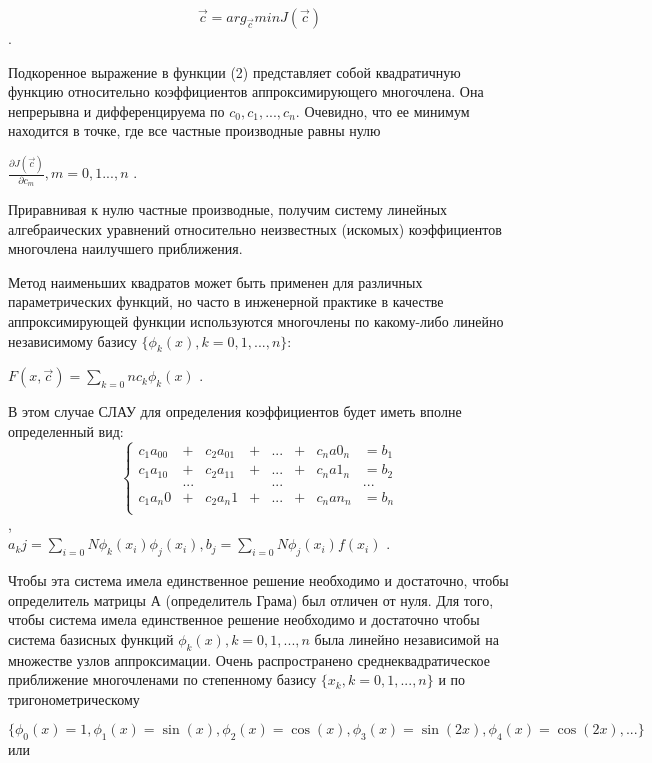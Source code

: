 $$\vec{c}=arg_{\vec{c}} min J(\vec{c})$$.

Подкоренное выражение в функции (2) представляет собой квадратичную функцию относительно коэффициентов аппроксимирующего многочлена. Она непрерывна и дифференцируема по  $c_0,c_1,...,c_n$. Очевидно, что ее минимум находится в точке, где все частные производные равны нулю

 $\frac{\partial{J(\vec{c})}}{\partial{c_m}}, m=0,1...,n$ . 

Приравнивая к нулю частные производные, получим систему линейных алгебраических уравнений относительно неизвестных (искомых) коэффициентов многочлена наилучшего приближения.

Метод наименьших квадратов может быть применен для различных параметрических функций, но часто в инженерной практике в качестве аппроксимирующей функции используются многочлены по какому-либо линейно независимому базису $\{\phi_k(x) , k=0,1,...,n\}$: 

$F(x,\vec{c})=\sum_{k=0}n c_k \phi_k(x)$ . 

В этом случае СЛАУ для определения коэффициентов будет иметь вполне определенный вид:
$$\left\{{\begin{array}{cccccccc}
c_1 a_00&+&c_2 a_01&+&...&+&c_n a0_n&=b_1\\
c_1 a_10&+&c_2 a_11&+&...&+&c_n a1_n&=b_2\\
&...&&&...&&&...\\
c_1 a_n0&+&c_2 a_n1&+&...&+&c_n an_n&=b_n\\
\end{array}}\right.$$,\\
$a_kj=\sum_{i=0}N \phi_k(x_i) \phi_j(x_i), b_j=\sum_{i=0}{N} \phi_j(x_i) f(x_i)$ .   

Чтобы эта система имела единственное решение необходимо и достаточно, чтобы определитель матрицы А (определитель Грама) был отличен от нуля. Для того, чтобы система имела единственное решение необходимо и достаточно чтобы система базисных функций $\phi_k(x) , k=0,1,...,n$  была линейно независимой на множестве узлов аппроксимации.
Очень распространено среднеквадратическое приближение многочленами по степенному базису $\{ x_k, k=0,1,...,n\}$ и по тригонометрическому 

$\{\phi_0(x)=1, \phi_1(x)=\sin(x), \phi_2(x)=\cos(x), \phi_3(x)=\sin(2x), \phi_4(x)=\cos(2x), ...        \}$ или 

